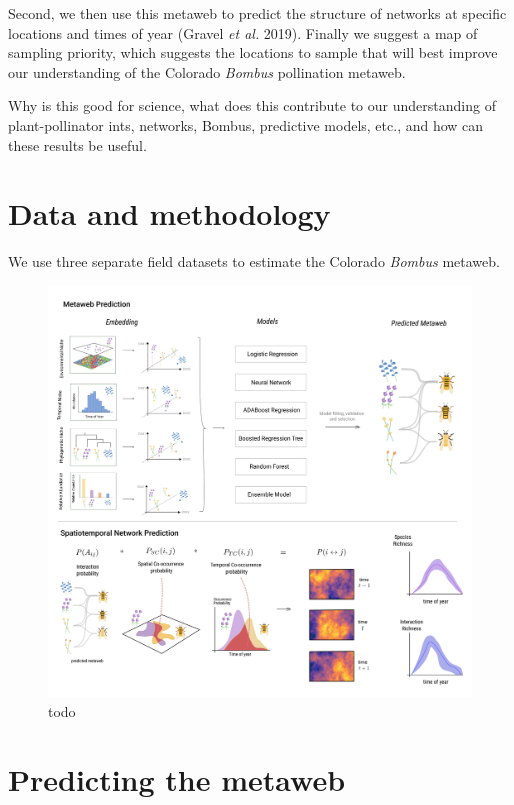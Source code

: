 \documentclass[11pt]{article}
\makeatletter
\def\maxwidth{\ifdim\Gin@nat@width>\linewidth\linewidth
\else\Gin@nat@width\fi}
\let\Oldincludegraphics\includegraphics
\renewcommand{\includegraphics}[1]{\Oldincludegraphics[width=\maxwidth]{#1}}
\makeatother
\begin{document}
Second, we then use this metaweb to predict the structure of networks at
specific locations and times of year (Gravel \emph{et al.} 2019).
Finally we suggest a map of sampling priority, which suggests the
locations to sample that will best improve our understanding of the
Colorado \emph{Bombus} pollination metaweb.

Why is this good for science, what does this contribute to our
understanding of plant-pollinator ints, networks, Bombus, predictive
models, etc., and how can these results be useful.

\hypertarget{data-and-methodology}{%
\section{Data and methodology}\label{data-and-methodology}}

We use three separate field datasets to estimate the Colorado
\emph{Bombus} metaweb.

\begin{figure}
\centering
\includegraphics{./figures/concept.png}
\caption{todo}
\end{figure}

\hypertarget{predicting-the-metaweb}{%
\section{Predicting the metaweb}\label{predicting-the-metaweb}}
\end{document}
